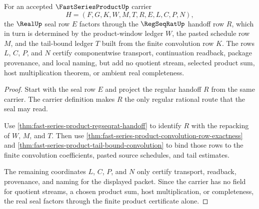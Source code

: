 \begin{theorem}
\label{thm:fast-series-product-real-seal-factorization}
For an accepted $\FastSeriesProductUp$ carrier
$$
H=(F,G,K,W,M,T,R,E,L,C,P,N),
$$
the $\RealUp$ seal row $E$ factors through the $\RegSeqRatUp$ handoff row $R$, which in turn is determined by the product-window ledger $W$, the pasted schedule row $M$, and the tail-bound ledger $T$ built from the finite convolution row $K$. The rows $L$, $C$, $P$, and $N$ certify componentwise transport, continuation readback, package provenance, and local naming, but add no quotient stream, selected product sum, host multiplication theorem, or ambient real completeness.
\end{theorem}
\begin{proof}
Start with the seal row $E$ and project the regular handoff $R$ from the same carrier. The carrier definition makes $R$ the only regular rational route that the seal may read.

Use \autoref{thm:fast-series-product-regseqrat-handoff} to identify $R$ with the repacking of $W$, $M$, and $T$. Then use \autoref{thm:fast-series-product-convolution-row-exactness} and \autoref{thm:fast-series-product-tail-bound-convolution} to bind those rows to the finite convolution coefficients, pasted source schedules, and tail estimates.

The remaining coordinates $L$, $C$, $P$, and $N$ only certify transport, readback, provenance, and naming for the displayed packet. Since the carrier has no field for quotient streams, a chosen product sum, host multiplication, or completeness, the real seal factors through the finite product certificate alone.
\end{proof}

